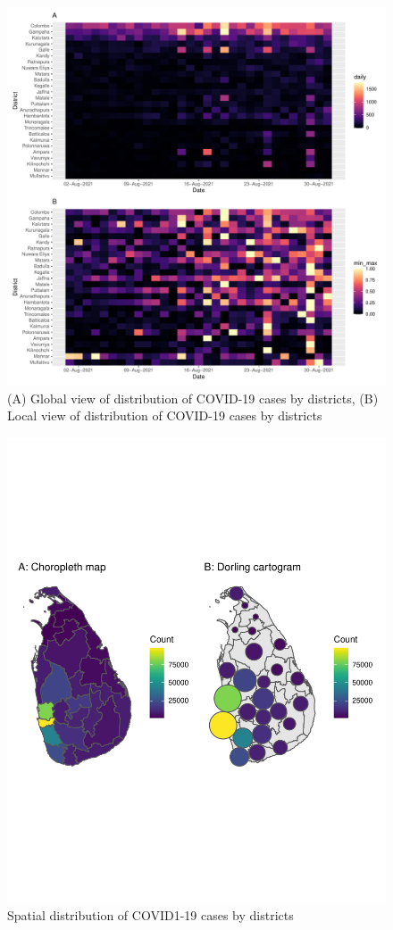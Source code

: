 \documentclass[
]{article}
\begin{document}
\begin{figure}
\centering
\includegraphics{manuscript_covid19dashboard_files/figure-latex/unnamed-chunk-3-1.pdf}
\caption{(A) Global view of distribution of COVID-19 cases by districts,
(B) Local view of distribution of COVID-19 cases by districts}
\end{figure}

\begin{figure}
\centering
\includegraphics{manuscript_covid19dashboard_files/figure-latex/unnamed-chunk-4-1.pdf}
\caption{Spatial distribution of COVID1-19 cases by districts}
\end{figure}
\end{document}
